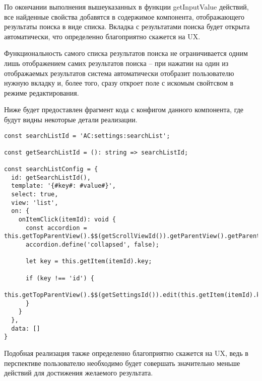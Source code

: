 По окончании выполнения вышеуказанных в функции getInputValue действий, все найденные свойства добавятся в содержимое компонента, отображающего результаты поиска в виде списка. Вкладка с результатами поиска будет открыта автоматически, что определенно благоприятно скажется на UX.

Функциональность самого списка результатов поиска не ограничивается одним лишь отображением самих результатов поиска -- при нажатии на один из отображаемых результатов система автоматически отобразит пользователю нужную вкладку и, более того, сразу откроет поле с искомым свойтсвом в режиме редактирования.

Ниже будет предоставлен фрагмент кода с конфигом данного компонента, где будут видны некоторые детали реализации.

\begin{lstlisting}
const searchListId = 'AC:settings:searchList';

const getSearchListId = (): string => searchListId;

const searchListConfig = {
  id: getSearchListId(),
  template: '{#key#: #value#}',
  select: true,
  view: 'list',
  on: {
    onItemClick(itemId): void {
      const accordion = this.getTopParentView().$$(getScrollViewId()).getParentView().getParentView();
      accordion.define('collapsed', false);

      let key = this.getItem(itemId).key;

      if (key !== 'id') {
        this.getTopParentView().$$(getSettingsId()).edit(this.getItem(itemId).key);
      }
    }
  },
  data: []
}
\end{lstlisting}

Подобная реализация также определенно благоприятно скажется на UX, ведь в перспективе пользователю необходимо будет совершать значительно меньше действий для достижения желаемого результата.